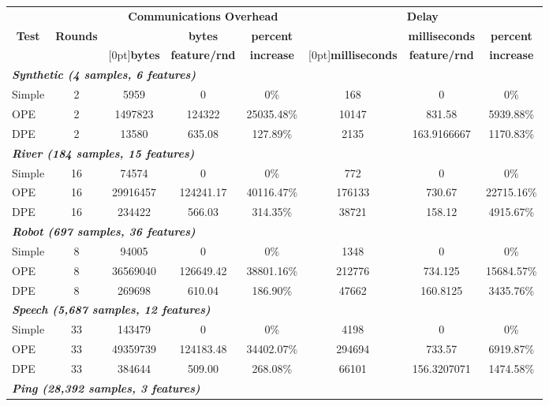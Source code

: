 \begin{table}
\begin{center}
\begin{tabular}{|l|c|c|c|c|c|c|c|}
\hline
& & \multicolumn{3}{|c|}{\bf Communications Overhead}
& \multicolumn{3}{|c|}{\bf Delay} \\
\cline{3-8}
\multicolumn{1}{|c|}{\bf Test} & {\bf Rounds} & & {\bf bytes} & {\bf percent}
& & {\bf milliseconds} & {\bf percent} \\
& & \raisebox{1.5ex}[0pt]{\bf bytes} & {\bf feature/rnd} & {\bf increase}
& \raisebox{1.5ex}[0pt]{\bf milliseconds} & {\bf feature/rnd} & {\bf increase} \\
\hline
\hline
\multicolumn{8}{|l|}{\bf\it Synthetic ({\it 4 samples, 6 features})} \\
\hline
Simple & 2 & 5959     & 0       & 0\%      & 168   & 0      & 0\% \\
\hline
OPE    & 2 & 1497823  & 124322 & 25035.48\%  & 10147 & 831.58 & 5939.88\%  \\
\hline
DPE    & 2 & 13580 & 635.08 & 127.89\% & 2135  & 163.9166667 & 1170.83\%  \\
\hline
\hline  
\multicolumn{8}{|l|}{\bf\it River ({\it 184 samples, 15 features})} \\
\hline
Simple & 16 & 74574 & 0 & 0\% & 772 & 0 & 0\% \\
\hline
OPE & 16 & 29916457 & 124241.17 & 40116.47\% & 176133 & 730.67 & 22715.16\% \\
\hline
DPE & 16 & 234422 & 566.03 & 314.35\% & 38721 & 158.12 & 4915.67\% \\
\hline
\hline
\multicolumn{8}{|l|}{\bf\it Robot ({\it 697 samples, 36 features})} \\
\hline
Simple & 8 & 94005 & 0 & 0\% & 1348 & 0 & 0\% \\
\hline
OPE & 8 & 36569040 & 126649.42 & 38801.16\% & 212776 & 734.125 & 15684.57\% \\
\hline
DPE & 8 & 269698 & 610.04 & 186.90\% & 47662 & 160.8125 & 3435.76\% \\
\hline
\hline
\multicolumn{8}{|l|}{\bf\it Speech ({\it 5,687 samples, 12 features})} \\
\hline
Simple & 33 & 143479 & 0 & 0\% & 4198 & 0 & 0\% \\
\hline
OPE & 33 & 49359739 & 124183.48 & 34402.07\% & 294694 & 733.57 & 6919.87\% \\
\hline
DPE & 33 & 384644 & 509.00 & 268.08\% & 66101 & 156.3207071 & 1474.58\% \\
\hline
\hline
\multicolumn{8}{|l|}{\bf\it Ping ({\it 28,392 samples, 3 features})} \\

\end{tabular}
\end{center}
\end{table}
